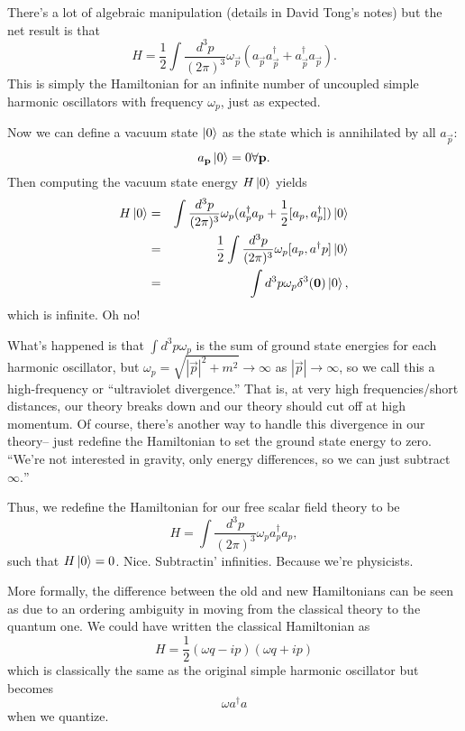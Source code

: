 There's a lot of algebraic manipulation (details in David Tong's notes) but the net result is that
$$H=\frac{1}{2} \int \frac{d^3p}{(2\pi)^3} \omega_{\vec p}(a_{\vec p} a_{\vec p}^\dagger + a_{\vec p}^\dagger a_{\vec p}).$$
This is simply the Hamiltonian for an infinite number of uncoupled simple harmonic oscillators with frequency $\omega_p$, just as expected.

Now we can define a vacuum state $\left| 0 \right>$ as the state which is annihilated by all $a_{\vec p}$: 
$$a_{\boldsymbol{\mathbf{p}}}\left| 0 \right>=0 \forall \boldsymbol{\mathbf{p}}.$$
Then computing the vacuum state energy $H\left| 0 \right>$ yields
\begin{eqnarray*}
H\left| 0 \right>&=&\int \frac{d^3p}{(2\pi)^3}\omega_p (a_p^\dagger a_p + \frac{1}{2}[a_p, a_p^\dagger])\left| 0 \right>\\
&=&\frac{1}{2}\int \frac{d^3 p}{(2\pi)^3}\omega_p [a_p, a^\dagger p] \left| 0 \right>\\
&=& \int d^3 p \omega_p \delta^3 (\boldsymbol{\mathbf{0}})\left| 0 \right>,
\end{eqnarray*}
which is infinite. Oh no!

What's happened is that $\int d^3p \omega_p$ is the sum of ground state energies for each harmonic oscillator, but $\omega_p =\sqrt{|\vec p|^2 + m^2} \to \infty$ as $|\vec p|\to \infty$, so we call this a high-frequency or ``ultraviolet divergence.'' That is, at very high frequencies/short distances, our theory breaks down and our theory should cut off at high momentum. Of course, there's another way to handle this divergence in our theory-- just redefine the Hamiltonian to set the ground state energy to zero. ``We're not interested in gravity, only energy differences, so we can just subtract $\infty.$''

Thus, we redefine the Hamiltonian for our free scalar field theory to be
$$H=\int \frac{d^3 p}{(2\pi)^3} \omega_p a_p^\dagger a_p,$$
such that $H\left| 0 \right>=0$. Nice. Subtractin' infinities. Because we're physicists.

More formally, the difference between the old and new Hamiltonians can be seen as due to an ordering ambiguity in moving from the classical theory to the quantum one. We could have written the classical Hamiltonian as
$$H=\frac{1}{2}(\omega q-ip)(\omega q+ ip)$$
which is classically the same as the original simple harmonic oscillator but becomes
$$\omega a^\dagger a$$ when we quantize.

